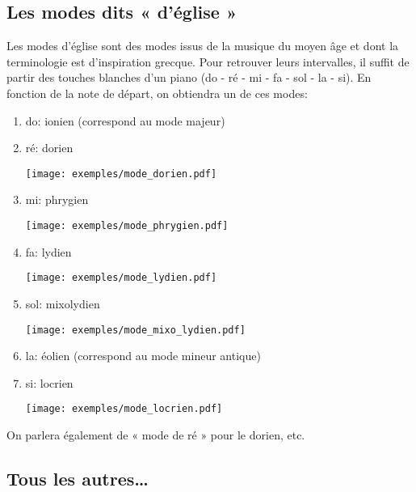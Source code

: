 \documentclass[11pt]{scrreprt}
\begin{document}
\subsection{Les modes dits « d'église »}
Les modes d'église sont des modes issus de la musique du moyen âge et dont la terminologie est d'inspiration grecque. Pour retrouver leurs intervalles, il suffit de partir des touches blanches d'un piano (do - ré - mi - fa - sol - la - si). En fonction de la note de départ, on obtiendra un de ces modes:

\begin{enumerate}
\item do: ionien (correspond au mode majeur)
\item ré: dorien
\begin{center}
   \texttt{[image: exemples/mode\_dorien.pdf]}
\end{center}
\item mi: phrygien
\begin{center}
   \texttt{[image: exemples/mode\_phrygien.pdf]}
\end{center}
\item fa: lydien
\begin{center}
   \texttt{[image: exemples/mode\_lydien.pdf]}
\end{center}
\item sol: mixolydien
\begin{center}
   \texttt{[image: exemples/mode\_mixo\_lydien.pdf]}
\end{center}
\item la: éolien (correspond au mode mineur antique)
\item si: locrien
\begin{center}
   \texttt{[image: exemples/mode\_locrien.pdf]}
\end{center}
\end{enumerate}


On parlera également de « mode de ré » pour le dorien, etc.

\subsection{Tous les autres…}
\end{document}

